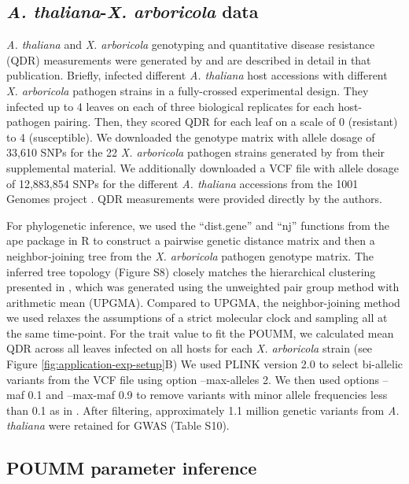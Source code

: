 \documentclass[11pt]{article}
\begin{document}
\begin{linenumbers}
\subsection*{\emph{A. thaliana}-\emph{X. arboricola} data}
\emph{A. thaliana} and \emph{X. arboricola} genotyping and quantitative disease resistance (QDR) measurements were generated by \cite{Wang2018Two-wayGenomes} and are described in detail in that publication. Briefly, \cite{Wang2018Two-wayGenomes} infected different \emph{A. thaliana} host accessions with different \emph{X. arboricola} pathogen strains in a fully-crossed experimental design. They infected up to 4 leaves on each of three biological replicates for each host-pathogen pairing. Then, they scored QDR for each leaf on a scale of 0 (resistant) to 4 (susceptible). We downloaded the genotype matrix with allele dosage of 33,610 SNPs for the 22 \emph{X. arboricola} pathogen strains generated by \cite{Wang2018Two-wayGenomes} from their supplemental material. We additionally downloaded a VCF file with allele dosage of 12,883,854 SNPs for the different \emph{A. thaliana} accessions from the 1001 Genomes project \citep{Alonso-Blanco20161135Thaliana}. QDR measurements were provided directly by the  \cite{Wang2018Two-wayGenomes} authors.

For phylogenetic inference, we used the ``dist.gene'' and ``nj'' functions from the ape package in R to construct a pairwise genetic distance matrix and then a neighbor-joining tree from the \emph{X. arboricola} pathogen genotype matrix. The inferred tree topology (Figure S8) closely matches the hierarchical clustering presented in \citep{Wang2018Two-wayGenomes}, which was generated using the unweighted pair group method with arithmetic mean (UPGMA). Compared to UPGMA, the neighbor-joining method we used relaxes the assumptions of a strict molecular clock and sampling all at the same time-point. For the trait value to fit the POUMM, we calculated mean QDR across all leaves infected on all hosts for each \emph{X. arboricola} strain (see Figure \ref{fig:application-exp-setup}B) We used PLINK version 2.0 to select bi-allelic variants from the VCF file using option --max-alleles 2. We then used options --maf 0.1 and --max-maf 0.9 to remove variants with minor allele frequencies less than 0.1 as in \cite{Wang2018Two-wayGenomes}. After filtering, approximately 1.1 million genetic variants from \emph{A. thaliana} were retained for GWAS (Table S10).

\subsection*{POUMM parameter inference}


\end{linenumbers}
\end{document}
